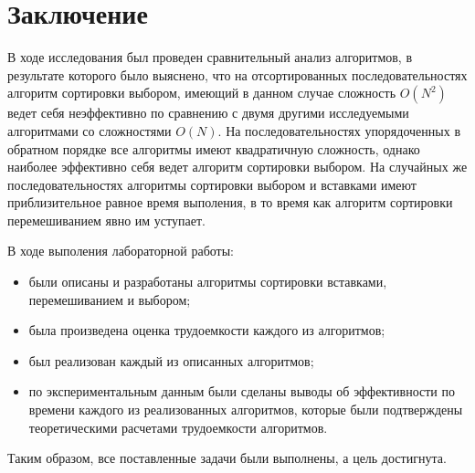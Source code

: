 \chapter*{Заключение}

В ходе исследования был проведен сравнительный анализ алгоритмов, в результате
которого было выяснено, что на отсортированных последовательностях алгоритм
сортировки выбором, имеющий в данном случае сложность $O(N^2)$ ведет себя
неэффективно по сравнению с двумя другими исследуемыми алгоритмами со
сложностями $O(N)$. На последовательностях упорядоченных в обратном порядке все
алгоритмы имеют квадратичную сложность, однако наиболее эффективно себя ведет
алгоритм сортировки выбором. На случайных же последовательностях алгоритмы
сортировки выбором и вставками имеют приблизительное равное время выполения, в
то время как алгоритм сортировки перемешиванием явно им уступает.

В ходе выполения лабораторной работы:

\begin{itemize}[left=\parindent]
    \item были описаны и разработаны алгоритмы сортировки вставками,
        перемешиванием и выбором;
    \item была произведена оценка трудоемкости каждого из алгоритмов;
    \item был реализован каждый из описанных алгоритмов;
    \item по экспериментальным данным были сделаны выводы об эффективности по
        времени каждого из реализованных алгоритмов, которые были подтверждены
        теоретическими расчетами трудоемкости алгоритмов.
\end{itemize}

Таким образом, все поставленные задачи были выполнены, а цель достигнута.
